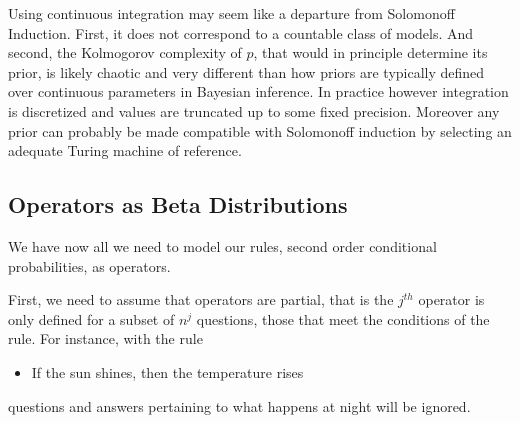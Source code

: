\documentclass[runningheads]{llncs}
\begin{document}
Using continuous integration may seem like a departure from Solomonoff
Induction. First, it does not correspond to a countable class of
models. And second, the Kolmogorov complexity of $p$, that would in
principle determine its prior, is likely chaotic and very different
than how priors are typically defined over continuous parameters in
Bayesian inference. In practice however integration is discretized and
values are truncated up to some fixed precision. Moreover any prior
can probably be made compatible with Solomonoff induction by selecting
an adequate Turing machine of reference.
\subsection{Operators as Beta Distributions}
\label{beta-op}
We have now all we need to model our rules, second order conditional
probabilities, as operators.

First, we need to assume that operators are partial, that is the
$j^{th}$ operator is only defined for a subset of $n^j$ questions,
those that meet the conditions of the rule. For instance, with the
rule
\begin{itemize}
\item If the sun shines, then the temperature rises
\end{itemize}
questions and answers pertaining to what happens at night will be
ignored.
\end{document}
